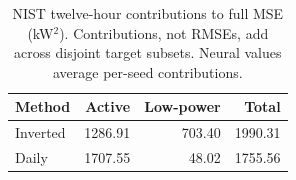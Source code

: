 \begin{table}[!tp]\caption{NIST twelve-hour contributions to full MSE (kW$^2$). Contributions, not RMSEs, add across disjoint target subsets. Neural values average per-seed contributions.}\label{tab:decomp}\centering\small\begin{tabular}{lrrr}\toprule Method & Active & Low-power & Total\\\midrule
Inverted & 1286.91 & 703.40 & 1990.31\\
Daily & 1707.55 & 48.02 & 1755.56\\
\bottomrule\end{tabular}\end{table}